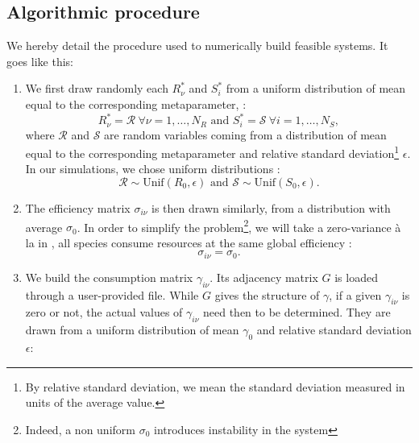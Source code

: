 \documentclass[12pt, titlepage]{report}
\begin{document}
\subsection{Algorithmic procedure}\label{sec : algorithmic procedure}
We hereby detail the procedure used to numerically build feasible systems. It goes like this:
\begin{enumerate}
  \item We first draw randomly each $R^*_\nu$
  and $S^*_i$ from a uniform distribution of mean equal to the corresponding metaparameter, \ie :
  \begin{equation}
     R^*_\nu = \mathcal{R} \ \forall \nu=1, \dots, N_R\text{ and }  S^*_i = \mathcal{S} \ \forall i=1, \dots, N_S,
  \end{equation}
  where $\mathcal{R}$ and $\mathcal{S}$ are random variables coming from a distribution of mean equal to the corresponding metaparameter and relative standard deviation\footnote{By relative standard deviation, we mean the standard deviation measured in units of the average value.} $\epsilon$. In our simulations, we chose uniform distributions :
  \begin{equation}
  \mathcal{R} \sim \text{Unif}(R_0, \epsilon) \text{ and } \mathcal{S} \sim \text{Unif}(S_0, \epsilon).
  \end{equation}
  \item The efficiency matrix $\sigma_{i\nu}$ is then drawn similarly, from a distribution with average $\sigma_0$. In order to simplify the problem\footnote{Indeed, a non uniform $\sigma_0$ introduces instability in the system}, we will take a zero-variance à la \citeauthor{butler_stability_2018} in \cite{butler_stability_2018}, \ie all species consume resources at the same global efficiency :
  \begin{equation}
    \sigma_{i\nu} = \sigma_0.
  \end{equation}
  \item We build the consumption matrix $\gamma_{i\nu}$. Its adjacency matrix $G$ is loaded through a user-provided file.
  While $G$ gives the structure of $\gamma$, \ie if a given $\gamma_{i\nu}$ is zero or not, the actual values of $\gamma_{i\nu}$ need then to be determined. They are drawn from a uniform distribution of mean $\gamma_0$ and relative standard deviation $\epsilon$:

\end{enumerate}
\end{document}
